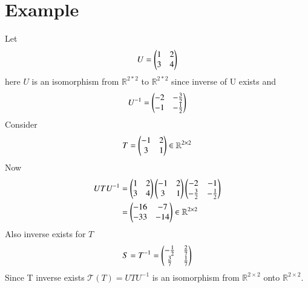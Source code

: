 \documentclass[journal,12pt,twocolumn]{IEEEtran}
\begin{document}
\section{Example}
Let
\begin{equation}
	U = \begin{pmatrix}1 & 2\\3 & 4\end{pmatrix}
\end{equation}
here $U$ is an isomorphism from $\mathbb{R}^{2*2}$ to $\mathbb{R}^{2*2}$ since inverse of U exists and
\begin{equation}
	U^{-1} = \begin{pmatrix}-2 & -\frac{3}{2}\\-1 & -\frac{1}{2}\end{pmatrix}
\end{equation}
Consider
\begin{equation}
	T = \begin{pmatrix}-1 & 2\\3 & 1\end{pmatrix} \in \mathbb{R}^{2 \times 2}
\end{equation}
Now
\begin{align}
	UTU^{-1} &= \begin{pmatrix}1 & 2\\3 & 4\end{pmatrix}\begin{pmatrix}-1 & 2\\3 & 1\end{pmatrix}\begin{pmatrix}-2 & -1\\-\frac{3}{2} & -\frac{1}{2}\end{pmatrix}\\
	&= \begin{pmatrix}-16 & -7\\-33 & -14\end{pmatrix} \in \mathbb{R}^{2 \times 2}
\end{align}
Also inverse exists for $T$
\begin{align}
	S = T^{-1} = \begin{pmatrix}-\frac{1}{2} & \frac{2}{7}\\\frac{3}{7} & \frac{1}{7}\end{pmatrix}
\end{align}
Since T inverse exists $\mathcal{T}(T) = UTU^{-1}$ is an isomorphism from $\mathbb{R}^{2\times2}$ onto $\mathbb{R}^{2\times2}$.  
\end{document}
